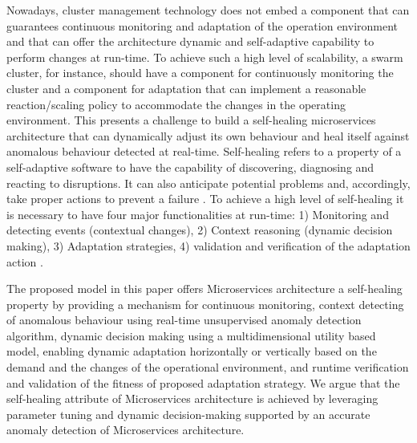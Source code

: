 \documentclass[sigconf]{acmart}
\begin{document}
Nowadays, cluster management technology does not embed a component that can guarantees continuous monitoring and adaptation of the operation environment and that can offer the architecture dynamic and self-adaptive capability to perform  changes at run-time. To achieve such a high level of scalability, a swarm cluster, for instance, should have a component for continuously monitoring the cluster and a component for adaptation that can implement a reasonable reaction/scaling policy to accommodate the changes in the operating environment. This presents a challenge to build a self-healing microservices architecture that can dynamically adjust its own behaviour and heal itself against anomalous behaviour detected at real-time. Self-healing refers to a property of a self-adaptive software to have the capability of discovering, diagnosing and reacting to disruptions. It can also anticipate potential problems and, accordingly, take proper actions to prevent a failure \cite{Salehie:2009p3693}. To achieve a high level of  self-healing it is necessary to have four major functionalities at run-time: 1) Monitoring and detecting events (contextual changes), 2) Context reasoning (dynamic decision making), 3) Adaptation strategies, 4) validation and verification of the adaptation action \cite{Kapitsaki:2009p3694}.  


The proposed model in this paper offers Microservices architecture a self-healing property by providing a mechanism for continuous monitoring, context detecting of anomalous behaviour using real-time unsupervised anomaly detection algorithm, dynamic decision making using a multidimensional utility based model, enabling dynamic adaptation horizontally or vertically based on the demand and the changes of the operational environment, and runtime verification and validation of the fitness of proposed adaptation strategy. We argue that the self-healing attribute of Microservices architecture is achieved by leveraging parameter tuning and dynamic decision-making supported by an accurate anomaly detection of Microservices architecture. 
\end{document}
